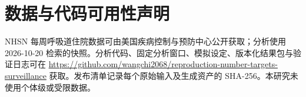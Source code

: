 \section*{数据与代码可用性声明}
\label{sec:availability}

NHSN 每周呼吸道住院数据可由美国疾病控制与预防中心公开获取\citep{cdc2026nhsn}；分析使用 2026-10-20 检索的快照。分析代码、固定分析窗口、模拟设定、版本化结果包与验证日志可在 \url{https://github.com/wangchi2068/reproduction-number-targets-surveillance} 获取。发布清单记录每个原始输入及生成资产的 SHA-256。本研究未使用个体级或受限数据。
